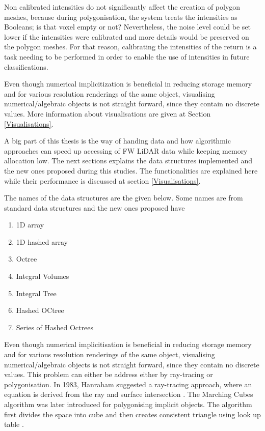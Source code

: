 \documentclass{subfiles}
\begin{document}
\par Non calibrated intensities do not significantly affect the creation of polygon meshes, because during polygonisation, the system treats the intensities as Booleans; is that voxel empty or not? Nevertheless, the noise level could be set lower if the intensities were calibrated and more details would be preserved on the polygon meshes. For that reason, calibrating the intensities of the return is a task needing to be performed in order to enable the use of intensities in future classifications. 

	
\par Even though numerical implicitization is beneficial in reducing storage memory and for various resolution renderings of the same object, visualising numerical/algebraic objects is not straight forward, since they contain no discrete values. More information about visualisations are given at Section \ref{Visualisations}. 

\par A big part of this thesis is the way of handing data and how algorithmic approaches can speed up accessing of FW LiDAR data while keeping memory allocation low. The next sections explains the data structures implemented and the new ones proposed during this studies. The functionalities are explained here while their performance is discussed at section \ref{Visualisations}. 

\par The names of the data structures are the given below. Some names are from standard data structures and the new ones proposed have 
\begin{enumerate}[noitemsep]
	\item 1D array
	\item 1D hashed array
	\item Octree
	\item Integral Volumes
	\item Integral Tree
	\item Hashed OCtree
	\item Series of Hashed Octrees
\end{enumerate} 
	
	
Even though numerical implicitisation is beneficial in reducing storage memory and for various resolution renderings of the same object, visualising numerical/algebraic objects is not straight forward, since they contain no discrete values. This problem can either be address either by ray-tracing or polygonisation. In 1983, Hanraham suggested a ray-tracing approach, where an equation is derived from the ray and surface intersection \cite{Hanrahan1983}.  The Marching Cubes algorithm was later introduced for polygonising implicit objects. The algorithm first divides the space into cube and then creates consistent triangle using look up table \cite{Lorensen1987}. \newline\newline
\end{document}
